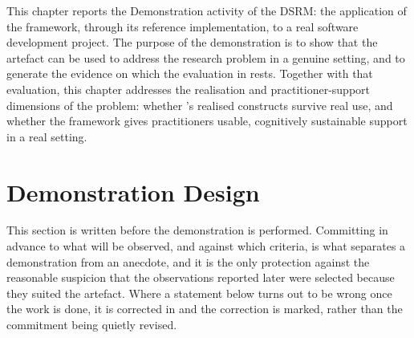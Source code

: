 \label{chap:demonstration}

This chapter reports the Demonstration activity of the \ac{DSRM}: the application of the framework, through its reference implementation, to a real software development project. The purpose of the demonstration is to show that the artefact can be used to address the research problem in a genuine setting, and to generate the evidence on which the evaluation in  rests. Together with that evaluation, this chapter addresses the realisation and practitioner-support dimensions of the problem: whether 's realised constructs survive real use, and whether the framework gives practitioners usable, cognitively sustainable support in a real setting.

\section{Demonstration Design}
\label{sec:demo_design}


This section is written before the demonstration is performed. Committing in advance to what will be observed, and against which criteria, is what separates a demonstration from an anecdote, and it is the only protection against the reasonable suspicion that the observations reported later were selected because they suited the artefact. Where a statement below turns out to be wrong once the work is done, it is corrected in  and the correction is marked, rather than the commitment being quietly revised.

